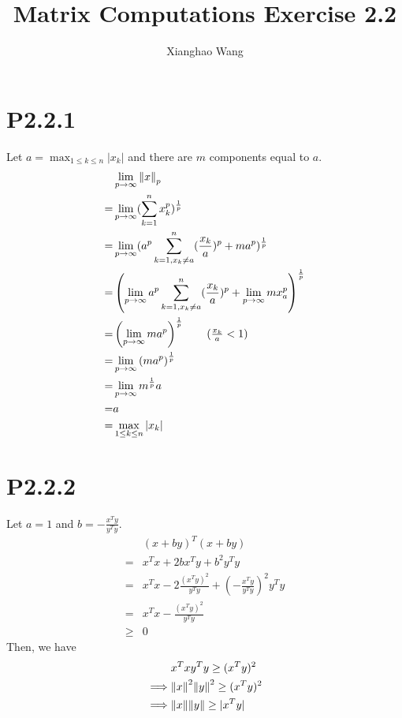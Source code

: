\documentclass{article}
\author{Xianghao Wang}
\title{Matrix Computations Exercise 2.2}
\begin{document}
\maketitle



\section*{P2.2.1}
Let $a=\max_{1\le k\le n} |x_k|$ and there are $m$ components equal to $a$.
\begin{align*}
      & \lim_{p\to\infty} \norm{x}_p                                                                                       \\
    = & \lim_{p\to\infty} (\sum_{k=1}^n x_k^p)^{\frac{1}{p}}                                                               \\
    = & \lim_{p\to\infty} (a^p \sum_{k=1,x_k\neq a}^n (\frac{x_k}{a})^p+ma^p)^\frac{1}{p}                                  \\
    = & \left(\lim_{p\to\infty} a^p \sum_{k=1,x_k\neq a}^n (\frac{x_k}{a})^p + \lim_{p\to\infty}m x_a^p\right)^\frac{1}{p} \\
    = & \left(\lim_{p\to\infty} m a^p\right)^\frac{1}{p}    \tag*{($\frac{x_k}{a} < 1$)}                                   \\
    = & \lim_{p\to\infty}  \left(m a^p\right)^\frac{1}{p}                                                                  \\
    = & \lim_{p\to\infty} m^\frac{1}{p} a                                                                                  \\
    = & a                                                                                                                  \\
    = & \max_{1\le k\le n} |x_k|
\end{align*}

\section*{P2.2.2}
Let $a=1$ and $b=-\frac{x^Ty}{y^Ty}$.
\begin{align*}
        & (x+by)^T(x+by)                                            \\
    =   & x^Tx + 2bx^Ty+ b^2y^Ty                                    \\
    =   & x^Tx -2\frac{(x^Ty)^2}{y^Ty} + (-\frac{x^Ty}{y^Ty})^2y^Ty \\
    =   & x^Tx -\frac{(x^Ty)^2}{y^Ty}                               \\
    \ge & 0
\end{align*}
Then, we have
\begin{align*}
             & x^Tx y^Ty \ge (x^Ty)^2            \\
    \implies & \norm{x}^2\norm{y}^2 \ge (x^Ty)^2 \\
    \implies & \norm{x}\norm{y} \ge |x^T y|
\end{align*}
\end{document}

